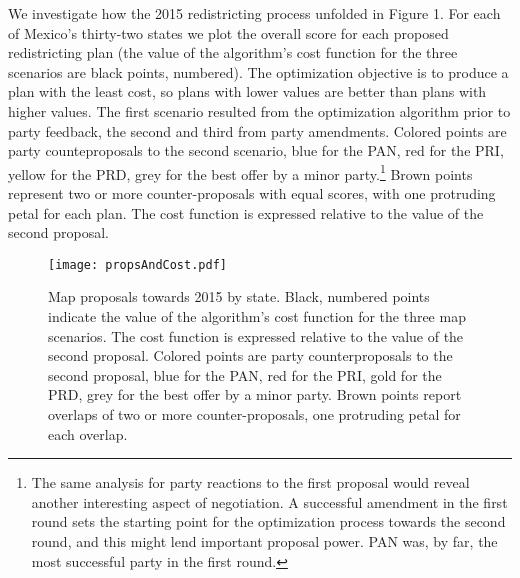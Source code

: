 \documentclass[letter,12pt]{article}
\begin{document}
We investigate how the 2015 redistricting process unfolded in Figure 1. For each of Mexico's thirty-two states we plot the overall score for each proposed redistricting plan (the value of the algorithm's cost function for the three scenarios are black points, numbered). The optimization objective is to produce a plan with the least cost, so plans with lower values are better than plans with higher values. The first scenario resulted from the optimization algorithm prior to party feedback, the second and third from party amendments. Colored points are party counteproposals to the second scenario, blue for the PAN, red for the PRI, yellow for the PRD, grey for the best offer by a minor party.\footnote{The same analysis for party reactions to the first proposal would reveal another interesting aspect of negotiation. A successful amendment in the first round sets the starting point for the optimization process towards the second round, and this might lend important proposal power. PAN was, by far, the most successful party in the first round.} Brown points represent two or more counter-proposals with equal scores, with one protruding petal for each plan. The cost function is expressed relative to the value of the second proposal. 


\begin{figure}
\begin{center}
    \texttt{[image: propsAndCost.pdf]} \\
  \caption{Map proposals towards 2015 by state. Black, numbered points indicate the value of the algorithm's cost function for the three map scenarios. The cost function is expressed relative to the value of the second proposal. Colored points are party counterproposals to the second proposal, blue for the PAN, red for the PRI, gold for the PRD, grey for the best offer by a minor party. Brown points report overlaps of two or more counter-proposals, one protruding petal for each overlap.}\label{F:propsAndCost}
\end{center}
\end{figure}
\end{document}
